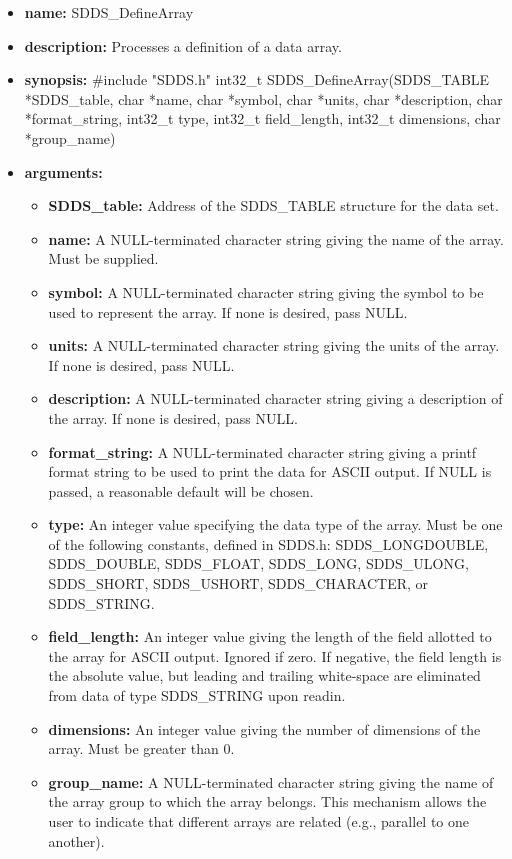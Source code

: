 \documentclass[11pt]{article}
\begin{document}
\begin{itemize}
\item {\bf name:}\newline
SDDS\_DefineArray
\item {\bf description:}\newline
Processes a definition of a data array.
\item {\bf synopsis:} \#include "SDDS.h"\newline
int32\_t SDDS\_DefineArray(SDDS\_TABLE *SDDS\_table, char *name, char *symbol, char *units, char *description, char *format\_string, int32\_t type, int32\_t field\_length, int32\_t dimensions, char *group\_name)
\item {\bf arguments:}
\begin{itemize}
\item {\bf SDDS\_table:} Address of the SDDS\_TABLE structure for the data set.
\item {\bf name:} A NULL-terminated character string giving the name of the array. Must be supplied.
\item {\bf symbol:} A NULL-terminated character string giving the symbol to be used to represent the array. If none is desired, pass NULL.
\item {\bf units:} A NULL-terminated character string giving the units of the array. If none is desired, pass NULL.
\item {\bf description:} A NULL-terminated character string giving a description of the array. If none is desired, pass NULL.
\item {\bf format\_string:} A NULL-terminated character string giving a  printf format string to be used to print the data for ASCII output. If NULL is passed, a reasonable default will be chosen.
\item {\bf type:} An integer value specifying the data type of the array. Must be one of the following constants, defined in  SDDS.h: SDDS\_LONGDOUBLE, SDDS\_DOUBLE, SDDS\_FLOAT, SDDS\_LONG, SDDS\_ULONG, SDDS\_SHORT, SDDS\_USHORT, SDDS\_CHARACTER, or SDDS\_STRING.
\item {\bf field\_length:} An integer value giving the length of the field allotted to the array for ASCII output. Ignored if zero. If negative, the field length is the absolute value, but leading and trailing white-space are eliminated from data of type SDDS\_STRING upon readin.
\item {\bf dimensions:} An integer value giving the number of dimensions of the array. Must be greater than 0.
\item {\bf group\_name:} A NULL-terminated character string giving the name of the array group to which the array belongs. This mechanism allows the user to indicate that different arrays are related (e.g., parallel to one another).

\end{itemize}
\end{itemize}
\end{document}
